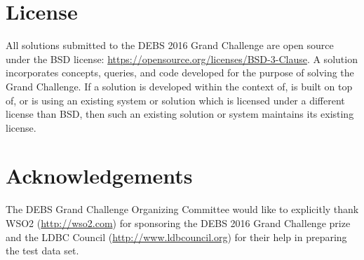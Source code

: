 \documentclass{sig-alternate}
\begin{document}
\section{License}
All solutions submitted to the DEBS 2016 Grand Challenge are open source under the BSD license: \url{https://opensource.org/licenses/BSD-3-Clause}. A solution incorporates concepts, queries, and code developed for the purpose of solving the Grand Challenge. If a solution is developed within the context of, is built on top of, or is using an existing system or solution which is licensed under a different license than BSD, then such an existing solution or system maintains its existing license.

\section{Acknowledgements}
The DEBS Grand Challenge Organizing Committee would like to explicitly thank WSO2 (\url{http://wso2.com}) for sponsoring the DEBS 2016 Grand Challenge prize and the LDBC Council (\url{http://www.ldbcouncil.org}) for their help in preparing the test data set.




\end{document}
